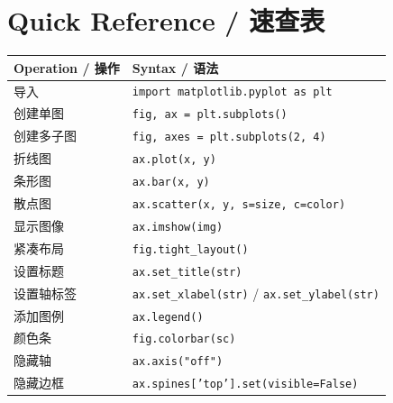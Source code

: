 \documentclass[11pt,a4paper]{article}
\begin{document}
\section{Quick Reference / 速查表}

\begin{table}[h]
\centering
\small
\renewcommand{\arraystretch}{1.3}
\begin{tabular}{@{}ll@{}}
\toprule
\textbf{Operation / 操作} & \textbf{Syntax / 语法} \\ \midrule
导入 & \texttt{import matplotlib.pyplot as plt} \\
创建单图 & \texttt{fig, ax = plt.subplots()} \\
创建多子图 & \texttt{fig, axes = plt.subplots(2, 4)} \\
折线图 & \texttt{ax.plot(x, y)} \\
条形图 & \texttt{ax.bar(x, y)} \\
散点图 & \texttt{ax.scatter(x, y, s=size, c=color)} \\
显示图像 & \texttt{ax.imshow(img)} \\
紧凑布局 & \texttt{fig.tight\_layout()} \\
设置标题 & \texttt{ax.set\_title(str)} \\
设置轴标签 & \texttt{ax.set\_xlabel(str)} / \texttt{ax.set\_ylabel(str)} \\
添加图例 & \texttt{ax.legend()} \\
颜色条 & \texttt{fig.colorbar(sc)} \\
隐藏轴 & \texttt{ax.axis("off")} \\
隐藏边框 & \texttt{ax.spines['top'].set(visible=False)} \\ \bottomrule
\end{tabular}
\end{table}
\end{document}
